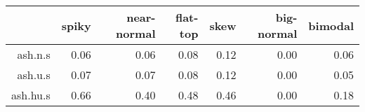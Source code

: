 \begin{tabular}{rrrrrrr}
  \toprule  & spiky & near-normal & flat-top & skew & big-normal & bimodal \\ 
  \midrule ash.n.s & 0.06 & 0.06 & 0.08 & 0.12 & 0.00 & 0.06 \\ 
  ash.u.s & 0.07 & 0.07 & 0.08 & 0.12 & 0.00 & 0.05 \\ 
  ash.hu.s & 0.66 & 0.40 & 0.48 & 0.46 & 0.00 & 0.18 \\ 
   \bottomrule \end{tabular}

